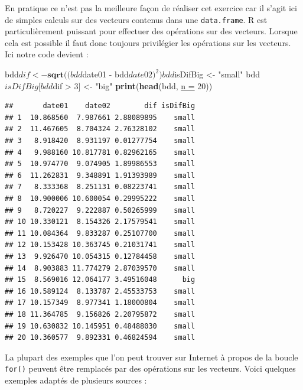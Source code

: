 \documentclass[twoside,symmetric]{book}
\newenvironment{Shaded}{}{}
\newcommand{\DataTypeTok}[1]{\underline{#1}}
\newcommand{\DecValTok}[1]{#1}
\newcommand{\KeywordTok}[1]{\textbf{#1}}
\newcommand{\NormalTok}[1]{#1}
\newcommand{\OperatorTok}[1]{#1}
\newcommand{\StringTok}[1]{#1}
\begin{document}
En pratique ce n'est pas la meilleure façon de réaliser cet exercice car il s'agit ici de simples calculs sur des vecteurs contenus dans une \texttt{data.frame}. R est particulièrement puissant pour effectuer des opérations sur des vecteurs. Lorsque cela est possible il faut donc toujours privilégier les opérations sur les vecteurs. Ici notre code devient :

\begin{Shaded}
\begin{Highlighting}[]
\NormalTok{bdd}\OperatorTok{$}\NormalTok{dif <-}\StringTok{ }\KeywordTok{sqrt}\NormalTok{((bdd}\OperatorTok{$}\NormalTok{date01 }\OperatorTok{-}\StringTok{ }\NormalTok{bdd}\OperatorTok{$}\NormalTok{date02)}\OperatorTok{^}\DecValTok{2}\NormalTok{)}
\NormalTok{bdd}\OperatorTok{$}\NormalTok{isDifBig <-}\StringTok{ "small"}
\NormalTok{bdd}\OperatorTok{$}\NormalTok{isDifBig[bdd}\OperatorTok{$}\NormalTok{dif }\OperatorTok{>}\StringTok{ }\DecValTok{3}\NormalTok{] <-}\StringTok{ "big"}
\KeywordTok{print}\NormalTok{(}\KeywordTok{head}\NormalTok{(bdd, }\DataTypeTok{n =} \DecValTok{20}\NormalTok{))}
\end{Highlighting}
\end{Shaded}

\begin{verbatim}
##       date01    date02        dif isDifBig
## 1  10.868560  7.987661 2.88089895    small
## 2  11.467605  8.704324 2.76328102    small
## 3   8.918420  8.931197 0.01277754    small
## 4   9.988160 10.817781 0.82962165    small
## 5  10.974770  9.074905 1.89986553    small
## 6  11.262831  9.348891 1.91393989    small
## 7   8.333368  8.251131 0.08223741    small
## 8  10.900006 10.600054 0.29995222    small
## 9   8.720227  9.222887 0.50265999    small
## 10 10.330121  8.154326 2.17579541    small
## 11 10.084364  9.833287 0.25107700    small
## 12 10.153428 10.363745 0.21031741    small
## 13  9.926470 10.054315 0.12784458    small
## 14  8.903883 11.774279 2.87039570    small
## 15  8.569016 12.064177 3.49516048      big
## 16 10.589124  8.133787 2.45533753    small
## 17 10.157349  8.977341 1.18000804    small
## 18 11.364785  9.156826 2.20795872    small
## 19 10.630832 10.145951 0.48488030    small
## 20 10.360577  9.892331 0.46824594    small
\end{verbatim}

La plupart des exemples que l'on peut trouver sur Internet à propos de la boucle \texttt{for()} peuvent être remplacés par des opérations sur les vecteurs. Voici quelques exemples adaptés de plusieurs sources :
\end{document}
